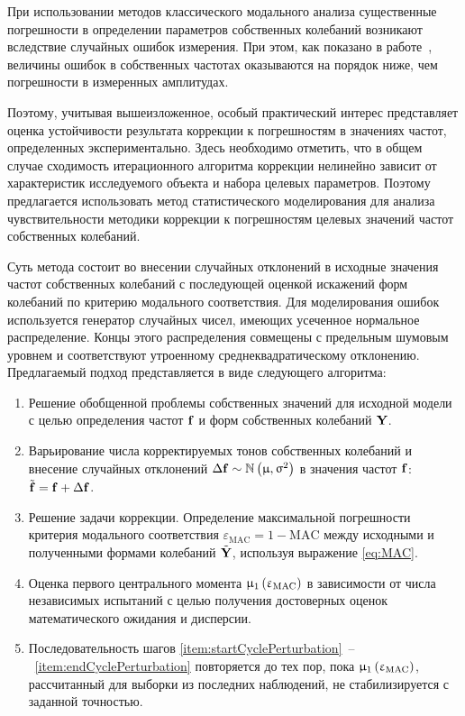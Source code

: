 При использовании методов классического модального анализа существенные погрешности в определении параметров собственных колебаний возникают вследствие случайных ошибок измерения. При этом, как показано в работе~\cite{lib:ema:Berns:book}, величины ошибок в собственных частотах оказываются на порядок ниже, чем погрешности в измеренных амплитудах. 

Поэтому, учитывая вышеизложенное, особый практический интерес представляет оценка устойчивости результата коррекции к погрешностям в значениях частот, определенных экспериментально. Здесь необходимо отметить, что в общем случае сходимость итерационного алгоритма коррекции нелинейно зависит от характеристик исследуемого объекта и набора целевых параметров. Поэтому предлагается использовать метод статистического моделирования для анализа чувствительности методики коррекции к погрешностям целевых значений частот собственных колебаний.

Суть метода состоит во внесении случайных отклонений в исходные значения частот собственных колебаний с последующей оценкой искажений форм колебаний по критерию модального соответствия. Для моделирования ошибок используется генератор случайных чисел, имеющих усеченное нормальное распределение. Концы этого распределения совмещены с предельным шумовым уровнем и соответствуют утроенному среднеквадратическому отклонению. Предлагаемый подход представляется в виде следующего алгоритма:
\begin{enumerate}[noitemsep]
	\item Решение обобщенной проблемы собственных значений для исходной модели с целью определения частот $ \mathbf{f} $ и форм собственных колебаний $ \mathbf{Y} $.
	\item Варьирование числа корректируемых тонов собственных колебаний и внесение случайных отклонений $ \Delta \mathbf{f} \sim \mathbb{N} \left( \upmu, \upsigma^2 \right) $ в значения частот $ \mathbf{f}$: $ \tilde{\mathbf{f}} = \mathbf{f} + \Delta \mathbf{f} $. \label{item:startCyclePerturbation}
	\item Решение задачи коррекции. Определение максимальной погрешности критерия модального соответствия $\varepsilon_{\mathrm{MAC}} = 1 - \mathrm{MAC}$ между исходными и полученными формами колебаний $ \tilde{\mathbf{Y}}$, используя выражение \eqref{eq:MAC}.
	\item Оценка первого центрального момента $ \upmu_1\left( \upvarepsilon_{\mathrm{MAC}} \right) $ в зависимости от числа независимых испытаний с целью получения достоверных оценок математического ожидания и дисперсии. \label{item:endCyclePerturbation}
	\item Последовательность шагов \ref{item:startCyclePerturbation}~--~\ref{item:endCyclePerturbation} повторяется до тех пор, пока $ \upmu_1\left( \upvarepsilon_{\mathrm{MAC}} \right) $, рассчитанный для выборки из последних наблюдений, не стабилизируется с заданной точностью.
\end{enumerate}

